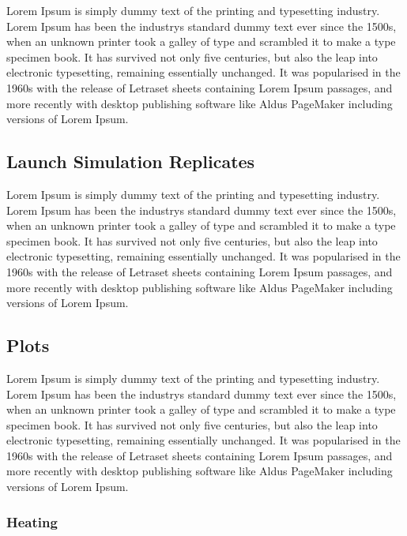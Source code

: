  Lorem Ipsum is simply dummy text of the printing and typesetting industry. Lorem Ipsum has been the industry\textquotesingle{}s standard dummy text ever since the 1500s, when an unknown printer took a galley of type and scrambled it to make a type specimen book. It has survived not only five centuries, but also the leap into electronic typesetting, remaining essentially unchanged. It was popularised in the 1960s with the release of Letraset sheets containing Lorem Ipsum passages, and more recently with desktop publishing software like Aldus Page\+Maker including versions of Lorem Ipsum.

 

\subsection*{Launch Simulation Replicates}

 Lorem Ipsum is simply dummy text of the printing and typesetting industry. Lorem Ipsum has been the industry\textquotesingle{}s standard dummy text ever since the 1500s, when an unknown printer took a galley of type and scrambled it to make a type specimen book. It has survived not only five centuries, but also the leap into electronic typesetting, remaining essentially unchanged. It was popularised in the 1960s with the release of Letraset sheets containing Lorem Ipsum passages, and more recently with desktop publishing software like Aldus Page\+Maker including versions of Lorem Ipsum.

 

\subsection*{Plots}

 Lorem Ipsum is simply dummy text of the printing and typesetting industry. Lorem Ipsum has been the industry\textquotesingle{}s standard dummy text ever since the 1500s, when an unknown printer took a galley of type and scrambled it to make a type specimen book. It has survived not only five centuries, but also the leap into electronic typesetting, remaining essentially unchanged. It was popularised in the 1960s with the release of Letraset sheets containing Lorem Ipsum passages, and more recently with desktop publishing software like Aldus Page\+Maker including versions of Lorem Ipsum.

 

\subsubsection*{Heating}


